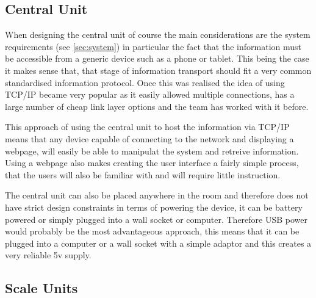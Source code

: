 \subsection{Central Unit}
\label{central design}
When designing the central unit of course the main considerations are the system requirements (see \ref{sec:system}) in particular the fact that the information must be accessible from a generic device such as a phone or tablet. This being the case it makes sense that, that stage of information transport should fit a very common standardised information protocol. Once this was realised the idea of using TCP/IP became very popular as it easily allowed multiple connections, has a large number of cheap link layer options and the team has worked with it before.

This approach of using the central unit to host the information via TCP/IP means that any device capable of connecting to the network and displaying a webpage, will easily be able to manipulat the system and retreive information. Using a webpage also makes creating the user interface a fairly simple process, that the users will also be familiar with and will require little instruction. 

The central unit can also be placed anywhere in the room and therefore does not have strict design constraints  in terms of powering the device, it can be battery powered or simply plugged into a wall socket or computer. Therefore USB power would probably be the most advantageous approach, this means that it can be plugged into a computer or a wall socket with a simple adaptor and this creates a very reliable 5v supply.

\subsection{Scale Units}


